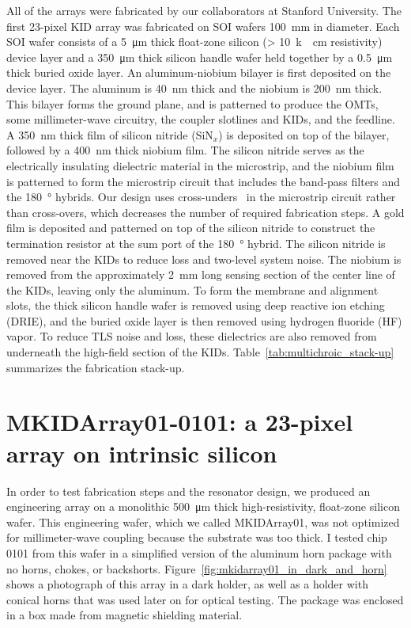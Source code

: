 All of the arrays were fabricated by our collaborators at Stanford University.
The first 23-pixel KID array was fabricated on SOI wafers \SI{100}{mm} in diameter.
Each SOI wafer consists of a \SI{5}{\micro\meter} thick float-zone silicon (> \SI{10}{k\Omega.cm} resistivity) device layer and a \SI{350}{\micro\meter} thick silicon handle wafer held together by a \SI{0.5}{\micro\meter} thick buried oxide layer.
An aluminum-niobium bilayer is first deposited on the device layer.
The aluminum is \SI{40}{nm} thick and the niobium is \SI{200}{nm} thick.
This bilayer forms the ground plane, and is patterned to produce the OMTs, some millimeter-wave circuitry, the coupler slotlines and KIDs, and the feedline.
A \SI{350}{nm} thick film of silicon nitride (SiN$_x$) is deposited on top of the bilayer, followed by a \SI{400}{nm} thick niobium film.
The silicon nitride serves as the electrically insulating dielectric material in the microstrip, and the niobium film is patterned to form the microstrip circuit that includes the band-pass filters and the \SI{180}{\degree} hybrids.
Our design uses cross-unders~\autocite{Duff2016JLTP} in the microstrip circuit rather than cross-overs, which decreases the number of required fabrication steps.
A gold film is deposited and patterned on top of the silicon nitride to construct the termination resistor at the sum port of the \SI{180}{\degree} hybrid.
The silicon nitride is removed near the KIDs to reduce loss and two-level system noise.
The niobium is removed from the approximately \SI{2}{mm} long sensing section of the center line of the KIDs, leaving only the aluminum.
To form the membrane and alignment slots, the thick silicon handle wafer is removed using deep reactive ion etching (DRIE), and the buried oxide layer is then removed using hydrogen fluoride (HF) vapor.
To reduce TLS noise and loss, these dielectrics are also removed from underneath the high-field section of the KIDs.
Table~\ref{tab:multichroic_stack-up} summarizes the fabrication stack-up.


\section{MKIDArray01-0101: a 23-pixel array on intrinsic silicon}
\label{sec:multichroic.mkidarray01}

In order to test fabrication steps and the resonator design, we produced an engineering array on a monolithic \SI{500}{\micro\meter} thick high-resistivity, float-zone silicon wafer.
This engineering wafer, which we called MKIDArray01, was not optimized for millimeter-wave coupling because the substrate was too thick.
I tested chip 0101 from this wafer in a simplified version of the aluminum horn package with no horns, chokes, or backshorts.
Figure~\ref{fig:mkidarray01_in_dark_and_horn} shows a photograph of this array in a dark holder, as well as a holder with conical horns that was used later on for optical testing.
The package was enclosed in a box made from magnetic shielding material.

